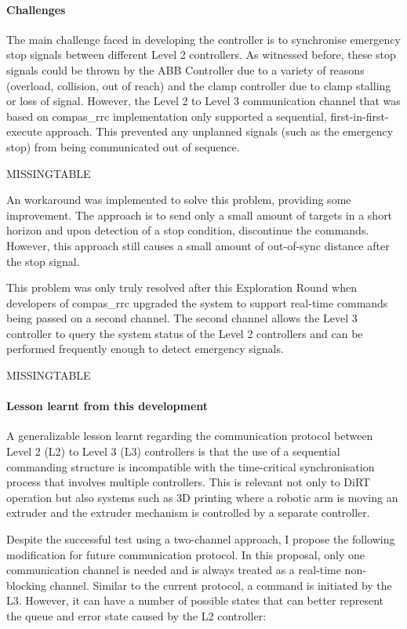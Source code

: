 \paragraph{Challenges}

The main challenge faced in developing the controller is to synchronise emergency stop signals between different Level 2 controllers. As witnessed before, these stop signals could be thrown by the ABB Controller due to a variety of reasons (overload, collision, out of reach) and the clamp controller due to clamp stalling or loss of signal. However, the Level 2 to Level 3 communication channel that was based on compas\_rrc implementation only supported a sequential, first-in-first-execute approach. This prevented any unplanned signals (such as the emergency stop) from being communicated out of sequence.

MISSINGTABLE

An workaround was implemented to solve this problem, providing some improvement. The approach is to send only a small amount of targets in a short horizon and upon detection of a stop condition, discontinue the commands. However, this approach still causes a small amount of out-of-sync distance after the stop signal. 

This problem was only truly resolved after this Exploration Round when developers of compas\_rrc upgraded the system to support real-time commands being passed on a second channel. The second channel allows the Level 3 controller to query the system status of the Level 2 controllers and can be performed frequently enough to detect emergency signals.

MISSINGTABLE

\paragraph{Lesson learnt from this development}

A generalizable lesson learnt regarding the communication protocol between Level 2 (L2) to Level 3 (L3) controllers is that the use of a sequential commanding structure is incompatible with the time-critical synchronisation process that involves multiple controllers. This is relevant not only to DiRT operation but also systems such as 3D printing where a robotic arm is moving an extruder and the extruder mechanism is controlled by a separate controller.

Despite the successful test using a two-channel approach, I propose the following modification for future communication protocol. In this proposal, only one communication channel is needed and is always treated as a real-time non-blocking channel. Similar to the current protocol, a command is initiated by the L3. However, it can have a number of possible states that can better represent the queue and error state caused by the L2 controller:

